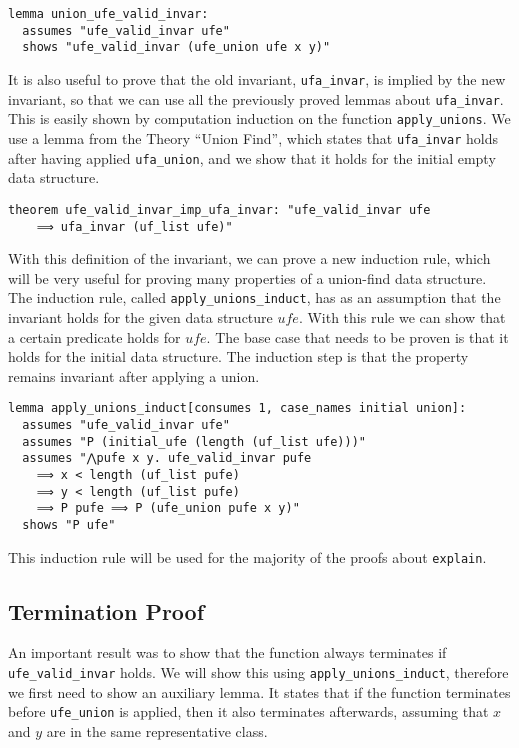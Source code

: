 \begin{lstlisting}
lemma union_ufe_valid_invar:
  assumes "ufe_valid_invar ufe"
  shows "ufe_valid_invar (ufe_union ufe x y)"
\end{lstlisting}

It is also useful to prove that the old invariant, \lstinline{ufa_invar}, is implied by the new invariant, so that we can use all the previously proved lemmas about \lstinline{ufa_invar}. This is easily shown by computation induction on the function \lstinline{apply_unions}. We use a lemma from the Theory ``Union Find'', which states that \lstinline{ufa_invar} holds after having applied \lstinline{ufa_union}, and we show that it holds for the initial empty data structure.

\begin{lstlisting}
theorem ufe_valid_invar_imp_ufa_invar: "ufe_valid_invar ufe
    ⟹ ufa_invar (uf_list ufe)"
\end{lstlisting}

With this definition of the invariant, we can prove a new induction rule, which will be very useful for proving many properties of a union-find data structure. The induction rule, called \lstinline{apply_unions_induct}, has as an assumption that the invariant holds for the given data structure $ufe$. With this rule we can show that a certain predicate holds for $ufe$. The base case that needs to be proven is that it holds for the initial data structure. The induction step is that the property remains invariant after applying a union.

\begin{lstlisting}
lemma apply_unions_induct[consumes 1, case_names initial union]:
  assumes "ufe_valid_invar ufe"
  assumes "P (initial_ufe (length (uf_list ufe)))"
  assumes "⋀pufe x y. ufe_valid_invar pufe
    ⟹ x < length (uf_list pufe)
    ⟹ y < length (uf_list pufe)
    ⟹ P pufe ⟹ P (ufe_union pufe x y)"
  shows "P ufe"
\end{lstlisting}

This induction rule will be used for the majority of the proofs about \lstinline|explain|.

\subsection{Termination Proof}
\label{subsection:termination}

An important result was to show that the function always terminates if \lstinline{ufe_valid_invar} holds. We will show this using \lstinline|apply_unions_induct|, therefore we first need to show an auxiliary lemma. It states that if the function terminates before \lstinline{ufe_union} is applied, then it also terminates afterwards, assuming that $x$ and $y$ are in the same representative class.

